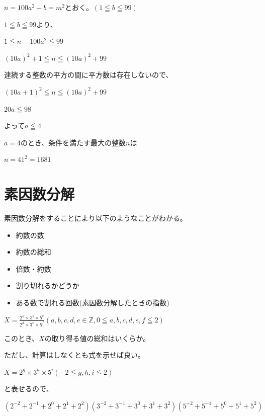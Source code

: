 \documentclass[uplatex,dvipdfmx]{jsbook}
\begin{document}
\begin{answer}[別解]
    $n=100a^2+b=m^2$とおく。$\left(1\leqq b \leqq 99\right)$

    $1\leqq b \leqq 99$より、

    $1\leqq n-100a^2 \leqq 99$

    $\left(10a\right)^2+1 \leqq n \leqq \left(10a\right)^2+99$

    連続する整数の平方の間に平方数は存在しないので、

    $\left(10a+1\right)^2 \leqq n \leqq \left(10a\right)^2+99$

    $20a \leqq 98$

    よって$a\leqq 4$

    $a=4$のとき、条件を満たす最大の整数$n$は

    $n=41^2=1681$
\end{answer}

\section{素因数分解}
素因数分解をすることにより以下のようなことがわかる。
\begin{itemize}
    \item 約数の数
    \item 約数の総和
    \item 倍数・約数
    \item 割り切れるかどうか
    \item ある数で割れる回数(素因数分解したときの指数)
\end{itemize}

\begin{problem}[練習問題]
    $\displaystyle X=\frac{2^a\times 3^b \times 5^c}{2^d\times 3^e \times 5^f}\left(a,b,c,d,e\in \mathbb{Z},0\leqq a,b,c,d,e,f\leqq 2\right)$

    このとき、$X$の取り得る値の総和はいくらか。

    ただし、計算はしなくとも式を示せば良い。
\end{problem}

\begin{answer}
    $\displaystyle X=2^g\times 3^h \times 5^i\left(-2\leqq g,h,i\leqq 2\right)$

    と表せるので、

    $\left(2^{-2}+2^{-1}+2^{0}+2^{1}+2^{2}\right)\left(3^{-2}+3^{-1}+3^{0}+3^{1}+3^{2}\right)\left(5^{-2}+5^{-1}+5^{0}+5^{1}+5^{2}\right)$
\end{answer}
\end{document}
